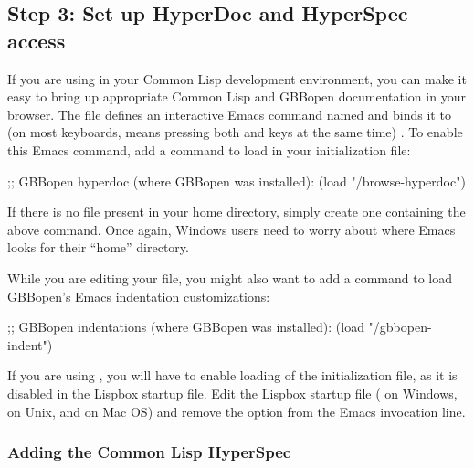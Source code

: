 \documentclass[10pt,twoside,english,pdftex]{article}
\begin{document}
\subsection*{Step 3: Set up  HyperDoc and HyperSpec access}

%
If you are using
 in your Common
Lisp development environment, you can make it easy to bring up appropriate
Common Lisp and GBBopen documentation in your browser.  The file
 defines an interactive
Emacs command named  and binds it to
 (on most keyboards,  means pressing
both  and  keys at the same time) .  To enable this Emacs
command, add a command to load
 in your 
initialization file:
%
\W\supp
\begin{example}
  ;; GBBopen hyperdoc (where GBBopen was installed):
  (load "/browse-hyperdoc")
\end{example}

If there is no  file present in your home directory, simply
create one containing the above command. Once again, Windows users need to
worry about where Emacs looks for their ``home'' directory.

While you are editing your  file, you might also want to add a
command to load GBBopen's Emacs indentation customizations:
%
\W\supp
\begin{example}
  ;; GBBopen indentations (where GBBopen was installed):
  (load "/gbbopen-indent")
\end{example}

If you are using
, you
will have to enable loading of the  initialization file, as it is
disabled in the Lispbox startup file.  Edit the Lispbox startup file
( on Windows,  on Unix, and
 on Mac
OS) and remove the  option from the Emacs
invocation line.

\subsubsection*{Adding the Common Lisp HyperSpec}
\end{document}
